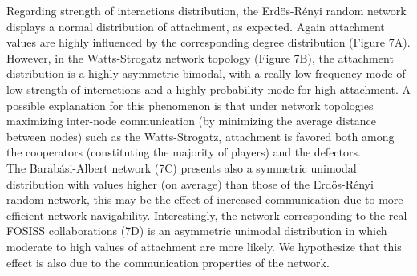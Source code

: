 \documentclass[11pt]{article}
\begin{document}
\FloatBarrier

Regarding strength of interactions distribution, the Erd\"{o}s-R\'enyi random
network displays a normal distribution of attachment, as
expected. Again attachment values are highly influenced by the
corresponding degree distribution (Figure 7A). However, in the Watts-Strogatz
network topology (Figure 7B), the attachment distribution is a
highly asymmetric bimodal, with a really-low frequency mode of low strength of
interactions and a highly probability mode for high attachment. A
possible explanation for this phenomenon is that under network topologies
maximizing inter-node communication (by minimizing the average distance between
nodes) such as the Watts-Strogatz, attachment is favored both
among the cooperators (constituting the majority of players) and the
defectors. \\ 


The Barab\'asi-Albert network (7C) presents also a symmetric unimodal
distribution with values higher (on average) than those of the Erd\"{o}s-R\'enyi
random network, this may be the effect of increased communication due to more
efficient network navigability. Interestingly, the network corresponding to the
real FOSISS collaborations (7D) is an asymmetric unimodal distribution in which
moderate to high values of attachment are more likely. We 
hypothesize that this effect is also due to the communication properties of the
network. 
\end{document}
